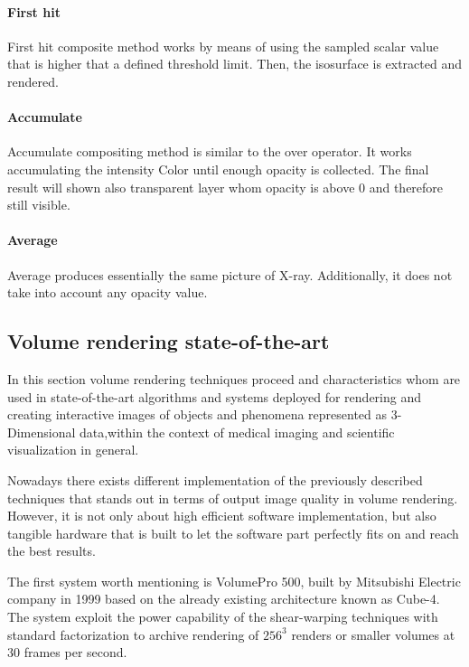 \documentclass[12pt,a4paper]{extarticle}
\newcommand{\linespace}{\vspace{8pt}}
\begin{document}
\paragraph{First hit} First hit composite method works by means of using the sampled scalar value that is higher that a defined threshold limit. Then, the isosurface is extracted and rendered.

\paragraph{Accumulate} Accumulate compositing method is similar to the over operator. It works accumulating the intensity Color until enough opacity is collected. The final result will shown also transparent layer whom opacity is above 0 and 
therefore still visible.

\paragraph{Average} Average produces essentially the same picture of X-ray. Additionally, it does not take into account any opacity value.

\subsection{Volume rendering state-of-the-art} 

In this section volume rendering techniques proceed and characteristics whom are used in state-of-the-art algorithms and systems deployed for rendering and creating interactive images of objects and phenomena represented as 3-Dimensional data,within the context of medical imaging and scientific visualization in general. 

Nowadays there exists different implementation of the previously described techniques that stands out in terms of output image quality in volume rendering. However, it is not only about high efficient software implementation, but also tangible hardware that is built to let the software part perfectly fits on and reach the best results.
\linespace

The first system worth mentioning is VolumePro 500, built by Mitsubishi Electric company in 1999 based on the already existing architecture known as Cube-4. The system exploit the power capability of the shear-warping techniques with standard factorization to archive rendering of $256^3$ renders or smaller volumes at 30 frames per second.%
\end{document}
